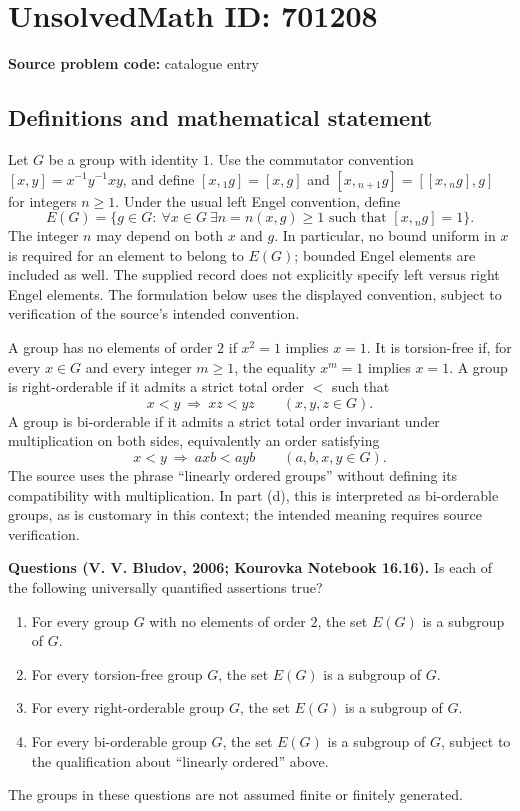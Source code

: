\documentclass[11pt]{article}
\begin{document}
\section*{UnsolvedMath ID: 701208}
\textbf{Source problem code:} catalogue entry
\subsection{Definitions and mathematical statement}
Let \(G\) be a group with identity \(1\). Use the commutator convention \([x,y]=x^{-1}y^{-1}xy\), and define \([x,{}_1 g]=[x,g]\) and \([x,{}_{n+1}g]=[[x,{}_n g],g]\) for integers \(n\geq 1\). Under the usual left Engel convention, define
\[
E(G)=\{g\in G:\ \forall x\in G\ \exists n=n(x,g)\geq 1\text{ such that }[x,{}_n g]=1\}.
\]
The integer \(n\) may depend on both \(x\) and \(g\). In particular, no bound uniform in \(x\) is required for an element to belong to \(E(G)\); bounded Engel elements are included as well. The supplied record does not explicitly specify left versus right Engel elements. The formulation below uses the displayed convention, subject to verification of the source's intended convention.

A group has no elements of order \(2\) if \(x^2=1\) implies \(x=1\). It is torsion-free if, for every \(x\in G\) and every integer \(m\geq 1\), the equality \(x^m=1\) implies \(x=1\). A group is right-orderable if it admits a strict total order \(<\) such that
\[
x<y\ \Longrightarrow\ xz<yz\qquad(x,y,z\in G).
\]
A group is bi-orderable if it admits a strict total order invariant under multiplication on both sides, equivalently an order satisfying
\[
x<y\ \Longrightarrow\ axb<ayb\qquad(a,b,x,y\in G).
\]
The source uses the phrase ``linearly ordered groups'' without defining its compatibility with multiplication. In part (d), this is interpreted as bi-orderable groups, as is customary in this context; the intended meaning requires source verification.

\textbf{Questions (V. V. Bludov, 2006; Kourovka Notebook 16.16).} Is each of the following universally quantified assertions true?
\begin{enumerate}
\item[(a)] For every group \(G\) with no elements of order \(2\), the set \(E(G)\) is a subgroup of \(G\).
\item[(b)] For every torsion-free group \(G\), the set \(E(G)\) is a subgroup of \(G\).
\item[(c)] For every right-orderable group \(G\), the set \(E(G)\) is a subgroup of \(G\).
\item[(d)] For every bi-orderable group \(G\), the set \(E(G)\) is a subgroup of \(G\), subject to the qualification about ``linearly ordered'' above.
\end{enumerate}
The groups in these questions are not assumed finite or finitely generated.
\end{document}
